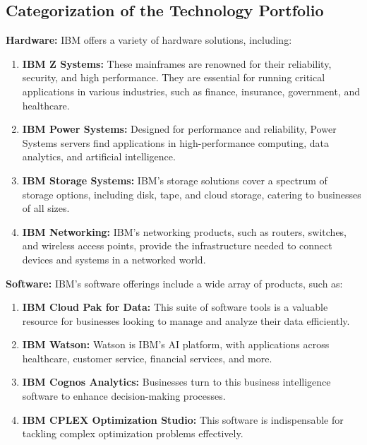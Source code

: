 \subsection{Categorization of the Technology Portfolio}

\textbf{Hardware:} IBM offers a variety of hardware solutions, including:

\begin{enumerate}
  \item \textbf{IBM Z Systems:} These mainframes are renowned for their reliability, security, and high performance. They are essential for running critical applications in various industries, such as finance, insurance, government, and healthcare.
  
  \item \textbf{IBM Power Systems:} Designed for performance and reliability, Power Systems servers find applications in high-performance computing, data analytics, and artificial intelligence.
  
  \item \textbf{IBM Storage Systems:} IBM's storage solutions cover a spectrum of storage options, including disk, tape, and cloud storage, catering to businesses of all sizes.
  
  \item \textbf{IBM Networking:} IBM's networking products, such as routers, switches, and wireless access points, provide the infrastructure needed to connect devices and systems in a networked world.
\end{enumerate}

\textbf{Software:} IBM's software offerings include a wide array of products, such as:

\begin{enumerate}
  \item \textbf{IBM Cloud Pak for Data:} This suite of software tools is a valuable resource for businesses looking to manage and analyze their data efficiently.
  
  \item \textbf{IBM Watson:} Watson is IBM's AI platform, with applications across healthcare, customer service, financial services, and more.
  
  \item \textbf{IBM Cognos Analytics:} Businesses turn to this business intelligence software to enhance decision-making processes.
  
  \item \textbf{IBM CPLEX Optimization Studio:} This software is indispensable for tackling complex optimization problems effectively.
\end{enumerate}

